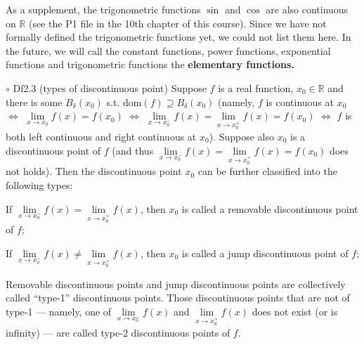 \documentclass{article}
\begin{document}
\begin{Rmk}{}
    As a supplement, the trigonometric functions $\sin$ and $\cos$ are also continuous on $\mathbb{R}$ (see the P1 file in the 10th chapter of this course). Since we have not formally defined the trigonometric functions yet, we could not list them here. In the future, we will call the constant functions, power functions, exponential functions and trigonometric functions the \textbf{elementary functions.}
\end{Rmk}

\begin{Df}{$\circ$ Df2.3 (types of discontinuous point)}
    Suppose $f$ is a real function, $x_0\in\mathbb{R}$ and there is some $B_\delta(x_0)$ s.t. $\text{dom}(f)\supseteq B_\delta(x_0)$ (namely, $f$ is continuous at $x_0$ $\Leftrightarrow$ $\lim\limits_{x\to x_0} f(x) = f(x_0)$ $\Leftrightarrow$ $\lim\limits_{x\to x_0^-} f(x) = \lim\limits_{x\to x_0^+} f(x) = f(x_0)$ $\Leftrightarrow$ $f$ is both left continuous and right continuous at $x_0$). Suppose also $x_0$ is a discontinuous point of $f$ (and thus $\lim\limits_{x\to x_0^-} f(x) = \lim\limits_{x\to x_0^+} f(x) = f(x_0)$ does not holds). Then the discontinuous point $x_0$ can be further classified into the following types:
    \begin{compactenum}
        \item If $\lim\limits_{x\to x_0^-} f(x) = \lim\limits_{x\to x_0^+} f(x)$, then $x_0$ is called a removable discontinuous point of $f$;
        \item If $\lim\limits_{x\to x_0^-} f(x) \neq \lim\limits_{x\to x_0^+} f(x)$, then $x_0$ is called a jump discontinuous point of $f$;
        \item Removable discontinuous points and jump discontinuous points are collectively called ``type-1'' discontinuous points. Those discontinuous points that are not of type-1 —  namely, one of $\lim\limits_{x\to x_0^-} f(x)$ and $\lim\limits_{x\to x_0^+} f(x)$ does not exist (or is infinity) —  are called type-2 discontinuous points of $f$.
    \end{compactenum} 
\end{Df}
\end{document}
